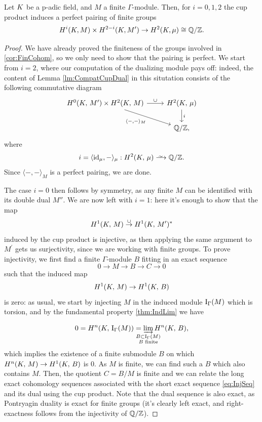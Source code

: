 \documentclass[a4paper, oneside]{memoir}
\begin{document}
\begin{theorem}
	Let $K$ be a p-adic field, and $M$ a finite $\Gamma$-module.
	Then, for $i=0,1,2$ the cup product induces a perfect pairing of finite groups
	\begin{equation*}
		H^i(K, M) \times H^{2-i}(K, M^{\prime}) \to H^2(K, \mu) \cong \mathbb{Q}/\mathbb{Z}.
	\end{equation*}
\end{theorem}
\begin{proof}
	We have already proved the finiteness of the groups involved in \ref{cor:FinCohom}, so we only need to show that the pairing is perfect.
	We start from $i=2$, where our computation of the dualizing module pays off: indeed, the content of Lemma \ref{lm:CompatCupDual}
	in this situtation consists of the following commutative diagram
	\begin{equation*}
		\begin{tikzcd}
			{\H{0}{\K}{M^\prime}  \times \HH{\K}{M}} \ar[swap, rd, "\langle - {,} - \rangle_M "] \ar[r, "\cup"] & \HH{\K}{\mu} \ar[d, "i"] \\
			& \Q/\Z,
		\end{tikzcd}
	\end{equation*}
	where
	\[
		i = \langle \id_{\mu}, - \rangle_\mu : \H{2}{\K}{\mu} \Iso \Q/\Z.
	\]
	Since \(\langle -{,}- \rangle_M\) is a perfect pairing, we are done.

	The case $i=0$ then follows by symmetry, as any finite $M$ can be identified with its double dual $M''$.
	We are now left with $i=1$: here it's enough to show that the map
	\[
		H^{1}( K, \, M ) \overset{\cup}{\to} H^{1}( K, \, M^\prime )^*
	\]
	induced by the cup product is injective, as then applying the same argument to $M^\prime$ gets us surjectivity, since we are working with finite groups.
	To prove injectivity, we first find a finite $\Gamma$-module $B$ fitting in an exact sequence
	\begin{equation}\label{eq:InjSeq}
		0\to M\to B\to C\to 0
	\end{equation}
	such that the induced map
	\[
		H^{1}( K, \, M )\to H^{1}( K, \, B )
	\]
	is zero:
	as usual, we start by injecting $M$ in the induced module $\operatorname{I}_{\Gamma}(M)$ which is torsion, and by the fundamental property \ref{thm:IndLim} we have

	\[
		0=\H{n}{\K}{\Ind{\Gamma}{M}}=\varinjlim_{\mathclap{\substack{B\subset\Ind{\Gamma}{M} \\B\text{ finite}}}}{\H{n}{\K}{B}},
	\]
	which implies the existence of a finite submodule \(B\) on which \(H^{n}( K, \, M )\to H^{1}( K, \, B )\) is \(0\). As \(M\) is finite, we can find such a \(B\) which also contains \(M\). Then, the quotient \(C=B/M\) is finite and we can relate the long exact cohomology sequences associated with the short exact sequence \eqref{eq:InjSeq}
	and its dual using the cup product. Note that the dual sequence is also exact, as Pontryagin duality is exact for finite groups (it's clearly left exact, and right-exactness follows from the injectivity of $\mathbb{Q}/\mathbb{Z}$).


\end{proof}
\end{document}

